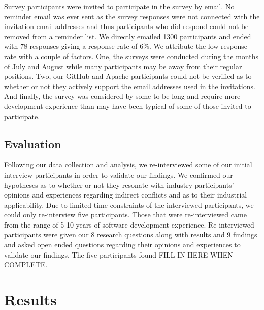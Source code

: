 \documentclass[conference]{IEEEtran}
\begin{document}
Survey participants were invited to participate in the survey by email. No reminder email was ever sent as the
survey responses were not connected with the invitation email addresses and thus participants who did respond
could not be removed from a reminder list. We directly emailed 1300 participants and ended with 78 responses
giving a response rate of 6\%. We attribute the low response rate with a couple of factors. One, the surveys
were conducted during the months of July and August while many participants may be away from their regular positions.
Two, our GitHub and Apache participants could not be verified as to whether or not they actively support the
email addresses used in the invitations. And finally, the survey was considered by some to be long and require
more development experience than may have been typical of some of those invited to participate.


\subsection{Evaluation}

Following our data collection and analysis, we re-interviewed some of our initial interview participants
in order to validate our findings. We confirmed our hypotheses as to whether or not they resonate with 
industry participants' opinions and experiences regarding indirect conflicts and as to their industrial 
applicability. Due to limited time constraints of the interviewed participants, we could only re-interview
five participants. Those that were re-interviewed came from the range of 5-10 years of software development
experience. Re-interviewed participants were given our 8 research questions along with results and 9 findings
and asked open ended questions regarding their opinions and experiences to validate our findings. The five
participants found FILL IN HERE WHEN COMPLETE.

\section{Results}
\label{sec:results}
\end{document}
